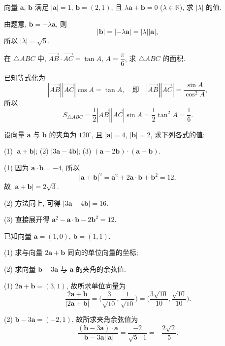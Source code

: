 \begin{exercise}
    向量 $\bm{a}$, $\bm{b}$ 满足 $|\bm{a}|=1$, $\bm{b}=(2,1)$, 
    且 $\lambda\bm{a}+\bm{b}=0$ ($\lambda\in\mathbb{R}$), 求 $|\lambda|$ 的值.
\end{exercise}
\beginsolution
    由题意, $\bm{b}= -\lambda\bm{a}$, 则
    \[|\bm{b}|= |-\lambda\bm{a}|= |\lambda| |\bm{a}|,\]
    所以 $|\lambda|= \sqrt5$.
\endsolution

\begin{exercise}
    在 $\triangle ABC$ 中, $\overrightarrow{AB}\cdot \overrightarrow{AC}=\tan A$, $A=\dfrac\pi6$, 求 $\triangle ABC$ 的面积.
\end{exercise}
\beginsolution
    已知等式化为
    \[|\overrightarrow{AB}| |\overrightarrow{AC}|\cos A= \tan A,
    \quad\text{即}\quad 
    |\overrightarrow{AB}| |\overrightarrow{AC}|= \frac{\sin A}{\cos^2 A},\]
    所以
    \[S_{\triangle ABC}
        = \frac12|\overrightarrow{AB}| |\overrightarrow{AC}|\sin A
        = \frac12\tan^2 A
        = \frac16.\]
\endsolution

\begin{exercise}
    设向量 $\bm{a}$ 与 $\bm{b}$ 的夹角为 $120^\circ$, 且 $|\bm{a}|=4$, $|\bm{b}|=2$, 求下列各式的值:
    
    (1) $|\bm{a}+\bm{b}|$;\qquad
    (2) $|3\bm{a}-4\bm{b}|$;\qquad
    (3) $(\bm{a}-2\bm{b})\cdot(\bm{a}+\bm{b})$.
\end{exercise}
\beginsolution
    (1) 因为 $\bm{a}\cdot\bm{b}= -4$, 所以
    \[|\bm{a}+\bm{b}|^2= \bm{a}^2+2\bm{a}\cdot\bm{b}+\bm{b}^2= 12,\]
    故 $|\bm{a}+\bm{b}|= 2\sqrt3$.

    (2) 方法同上, 可得 $|3\bm{a}-4\bm{b}|= 16$.

    (3) 直接展开得 $\bm{a}^2- \bm{a}\cdot\bm{b}- 2\bm{b}^2= 12$.
\endsolution

\begin{exercise}
    已知向量 $\bm{a}=(1,0)$, $\bm{b}=(1,1)$.
    
    (1) 求与向量 $2\bm{a}+\bm{b}$ 同向的单位向量的坐标;
    
    (2) 求向量 $\bm{b}-3\bm{a}$ 与 $\bm{a}$ 的夹角的余弦值.
\end{exercise}
\beginsolution
    (1) $2\bm{a}+\bm{b}= (3,1)$, 故所求单位向量为
    \[\frac{2\bm{a}+\bm{b}}{|2\bm{a}+\bm{b}|}
        = \biggl(\frac3{\sqrt{10}}, \frac1{\sqrt{10}}\biggr)
        = \biggl(\frac{3\sqrt{10}}{10}, \frac{\sqrt{10}}{10}\biggr).\]

    (2) $\bm{b}-3\bm{a}= (-2,1)$, 故所求夹角余弦值为
    \[\frac{(\bm{b}-3\bm{a})\cdot \bm{a}}{|\bm{b}-3\bm{a}| |\bm{a}|}
        = \frac{-2}{\sqrt5\cdot 1}
        = -\frac{2\sqrt2}5.\]
\endsolution

